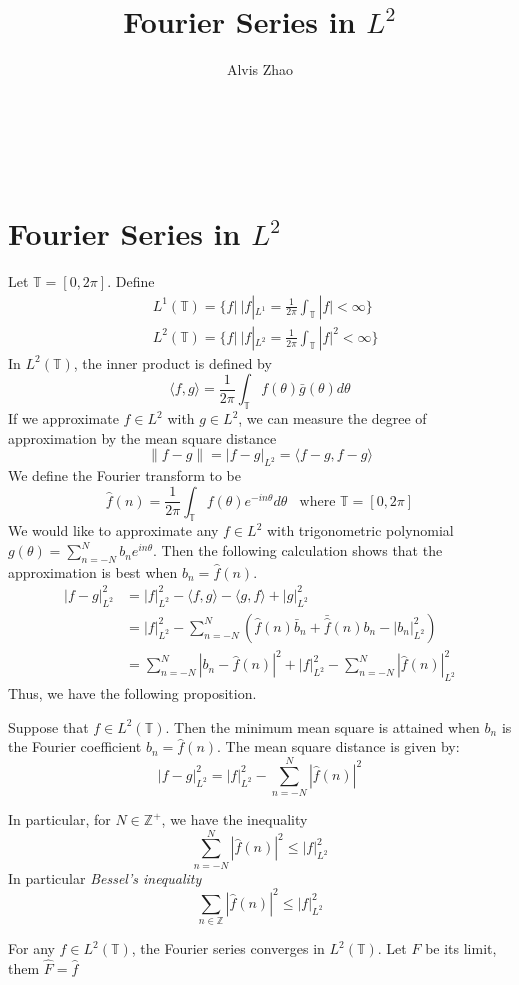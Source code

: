 \documentclass[12pt]{article}
\newenvironment{proposition}[1][Proposition.]{\begin{trivlist}
\item[\hskip \labelsep {\bfseries #1}]}{\end{trivlist}}
\newenvironment{lemma}[1][Lemma.]{\begin{trivlist}
\item[\hskip \labelsep {\bfseries #1}]}{\end{trivlist}}
\begin{document}
 
\title{Fourier Series in $L^2$}
\author{Alvis Zhao}
\makeatletter
\hfil\parbox[t]{\textwidth}{\Large\bfseries\@title\\[0.5ex]\normalsize\bfseries\@author\\[0.5ex]\@date}\par
\makeatother

\section*{Fourier Series in $L^2$}
Let $\mathbb{T} = [0,2\pi]$.
Define  
\begin{align*}
&L^1(\mathbb{T}) = \{f |\ |f|_{L^1} = \frac{1}{2\pi} \int_{\mathbb{T}} |f| < \infty\} \\
&L^2(\mathbb{T}) = \{f |\ |f|_{L^2} = \frac{1}{2\pi} \int_{\mathbb{T}} |f|^2 < \infty\}
\end{align*}
In $L^2(\mathbb{T})$, the inner product is defined by 
\[
\langle f,g\rangle = \frac{1}{2\pi}\int_{\mathbb{T}}f(\theta)\bar{g}(\theta)d\theta 
\]
If we approximate $f \in L^2$ with $g \in L^2$, we can measure the degree of approximation by the mean square distance
\[
\|f-g\| = |f - g|_{L^2} = \langle f-g, f-g \rangle
\]
We define the Fourier transform to be 
\[
\hat{f}(n) = \frac{1}{2\pi}\int_{\mathbb{T}}f(\theta)e^{-in\theta}d\theta \ \ \ \ \text{where $\mathbb{T} = [0,2\pi]$}
\]
We would like to approximate any $f \in L^2$ with trigonometric polynomial $g(\theta) = \sum_{n=-N}^{N}b_ne^{in\theta}$. Then the following calculation shows that the approximation is best when $b_n = \hat{f}(n)$.
\begin{align}
|f - g|_{L^2}^2 &= |f|_{L^2}^2 - \langle f,g\rangle - \langle g,f\rangle+ |g|_{L^2}^2 \\
&= |f|_{L^2}^2 - \sum\limits_{n=-N}^{N}(\hat{f}(n)\bar{b}_n+\bar{\hat{f}}(n)b_n - |b_n|_{L^2}^2 ) \\
&= \sum\limits_{n=-N}^{N}|b_n - \hat{f}(n)|^2 + |f|_{L^2}^2 - \sum\limits_{n=-N}^{N}|\hat{f}(n)|_{L^2}^2
\end{align}
Thus, we have the following proposition.
\begin{proposition}
Suppose that $f \in L^2(\mathbb{T})$. Then the minimum mean square is attained when $b_n$ is the Fourier coefficient $b_n = \hat{f}(n)$. The mean square distance is given by:
\[
|f - g|_{L^2}^2 = |f|_{L^2}^2 - \sum\limits_{n= -N}^{N}|\hat{f}(n)|^2
\] 
\end{proposition}
In particular, for $N \in \mathbb{Z}^+$, we have the inequality
\[
\sum\limits_{n= -N}^{N}|\hat{f}(n)|^2 \leqslant |f|_{L^2}^2
\] 
In particular \textit{Bessel's inequality}
\begin{equation}
\sum\limits_{n \in \mathbb{Z}}|\hat{f}(n)|^2 \leqslant |f|_{L^2}^2
\end{equation}
\begin{lemma}
For any $f \in L^2(\mathbb{T})$, the Fourier series converges in $L^2(\mathbb{T})$. Let $F$ be its limit, them $\hat{F} = \hat{f}$
\end{lemma}
\end{document}
